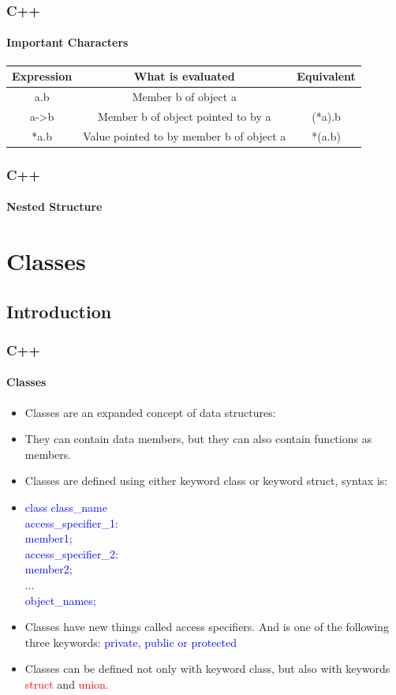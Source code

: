 \documentclass[hyperref={pdfpagelabels=true}]{beamer}
\begin{document}
\begin{frame}
\frametitle{C++}
\framesubtitle{Important Characters}
\footnotesize
\begin{tabular}{|c|c|c|}
\hline 
Expression &What is evaluated &Equivalent \\
\hline
a.b &Member b of object a &\\ \hline 
a->b&Member b of object pointed to by a&(*a).b \\ \hline
*a.b&Value pointed to by member b of object a&*(a.b)  \\ \hline
\end{tabular}
\end{frame}



\begin{frame}
\frametitle{C++}
\framesubtitle{Nested Structure}






\end{frame}

\section{Classes}
\subsection{Introduction}

\begin{frame}
\frametitle{C++}
\framesubtitle{Classes}
\small
\begin{itemize}[<+->]
\item Classes are an expanded concept of data structures:
\item They can contain data members, but they can also contain functions as members.
\item Classes are defined using either keyword class or keyword struct, syntax is:
\item[]  \textcolor{blue}{class class\_name { \\
  access\_specifier\_1:\\
    member1;\\
  access\_specifier\_2:\\
    member2;\\
  ...\\
} object\_names;}
\item Classes have new things called access specifiers. And is one of the following three keywords:\textcolor{blue}{ private, public or protected}
\item Classes can be defined not only with keyword class, but also with keywords \textcolor{red}{struct} and \textcolor{red}{union}.
\end{itemize}
\end{frame}
\end{document}
